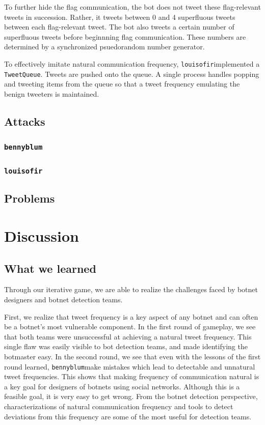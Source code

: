 \documentclass[11pt, oneside]{article} %
\numberwithin{equation}{section} %
\numberwithin{figure}{section} %
\numberwithin{table}{section} %
\renewcommand{\c}[1]{\texttt{#1}}
\newcommand{\teambb}{\c{bennyblum}}
\newcommand{\teamol}{\c{louisofir}}
\begin{document}
			To further hide the flag communication, the bot does not tweet these flag-relevant tweets in succession.  Rather, it tweets between 0 and 4 superfluous tweets between each  flag-relevant tweet.  The bot also tweets a certain number of superfluous tweets before beginnning flag communication.  These numbers are determined by a synchronized psuedorandom number generator.

			To effectively imitate natural communication frequency, \teamol implemented a \c{TweetQueue}.  Tweets are pushed onto the queue.  A single process handles popping and tweeting items from the queue so that a tweet frequency emulating the benign tweeters is maintained.
	\subsection{Attacks}
		\subsubsection{\teambb}
		\subsubsection{\teamol}
	\subsection{Problems}

\section{Discussion}

	\subsection{What we learned}
		Through our iterative game, we are able to realize the challenges faced by botnet designers and botnet detection teams.  

		First, we realize that tweet frequency is a key aspect of any botnet and can often be a botnet's most vulnerable component.  In the first round of gameplay, we see that both teams were unsuccessful at achieving a natural tweet frequency.  This single flaw was easily visible to bot detection teams, and made identifying the botmaster easy.  In the second round, we see that even with the lessons of the first round learned, \teambb make mistakes which lead to detectable and unnatural tweet frequencies.  This shows that making frequency of communication natural is a key goal for designers of botnets using social networks.  Although this is a feasible goal, it is very easy to get wrong.  From the botnet detection perspective, characterizations of natural communication frequency and tools to detect deviations from this frequency are some of the most useful for detection teams.  
\end{document}
